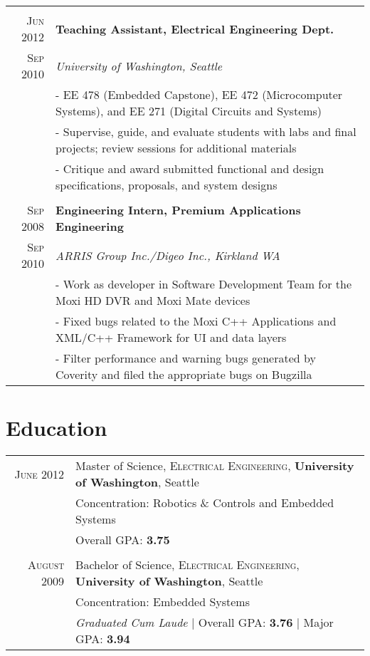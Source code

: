 \documentclass[letter,10pt]{article}
\begin{document}
\begin{tabular}{r|p{16cm}}
\multicolumn{2}{c}{} \\

\textsc{Jun 2012} & \textbf{Teaching Assistant, Electrical Engineering Dept.}\\
\textsc{Sep 2010}&\emph{University of Washington, Seattle}\\
&\footnotesize{
 - EE 478 (Embedded Capstone), EE 472 (Microcomputer Systems), and EE 271 (Digital Circuits and Systems)
}\\
&\footnotesize{
 - Supervise, guide, and evaluate students with labs and final projects; review sessions for additional materials
}\\
&\footnotesize{
 - Critique and award submitted functional and design specifications, proposals, and system designs
}\\

\multicolumn{2}{c}{} \\


\textsc{Sep 2008} & \textbf{Engineering Intern, Premium Applications Engineering}\\
\textsc{Sep 2010}&\emph{ARRIS Group Inc./Digeo Inc., Kirkland WA}\\
&\footnotesize{
 - Work as developer in Software Development Team for the Moxi HD DVR and Moxi Mate devices
}\\
&\footnotesize{
 - Fixed bugs related to the Moxi C++ Applications and XML/C++ Framework for UI and data layers
}\\
&\footnotesize{
 - Filter performance and warning bugs generated by Coverity and filed the appropriate bugs on Bugzilla
}\\

\end{tabular}

\section{Education}
\begin{tabular}{rl}	
 \textsc{June} 2012 & Master of Science, \textsc{Electrical Engineering}, \textbf{University of Washington}, Seattle\\
&\normalsize {Concentration}: Robotics \& Controls and Embedded Systems \\
& \small Overall GPA: \normalsize\textbf{3.75} \\
&\\

\textsc{August} 2009 & Bachelor of Science, \textsc{Electrical Engineering}, \textbf{University of Washington}, Seattle \\
&\normalsize {Concentration}: Embedded Systems \\
& \small\emph{Graduated Cum Laude} | Overall GPA: \normalsize\textbf{3.76} \small | Major GPA: \normalsize\textbf{3.94} \\

\end{tabular}
\end{document}
